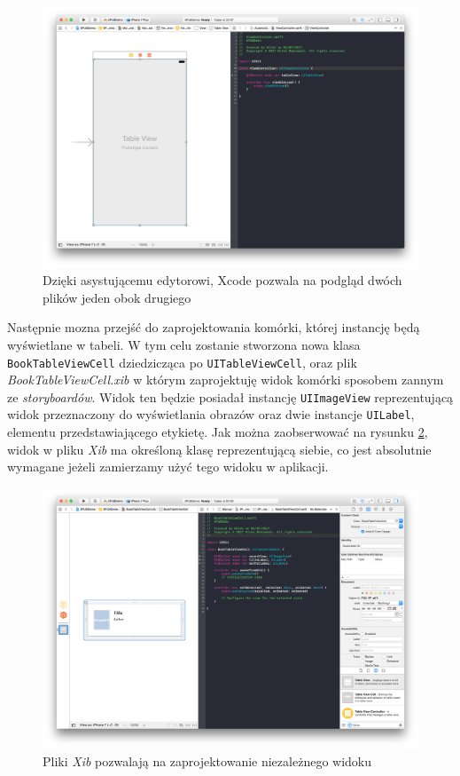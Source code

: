 \begin{figure}[ht!]
  \centering
  \includegraphics[width=120mm]{images/chapter-5-image-3-xcode-assistant.png}
  \caption{Dzięki asystującemu edytorowi, Xcode pozwala na podgląd dwóch plików jeden obok drugiego}
  \label{chapter-5-image-3-xcode-assistant}
\end{figure}

Następnie mozna przejść do zaprojektowania komórki, której instancję będą wyświetlane w tabeli. W tym celu zostanie stworzona nowa klasa \texttt{BookTableViewCell} dziedzicząca po \texttt{UITableViewCell}, oraz plik \textit{BookTableViewCell.xib} w którym zaprojektuję widok komórki sposobem zannym ze \textit{storyboardów}. Widok ten będzie posiadał instancję \texttt{UIImageView} reprezentującą widok przeznaczony do wyświetlania obrazów oraz dwie instancje \texttt{UILabel}, elementu przedstawiającego etykietę. Jak można zaobserwować na rysunku \ref{chapter-5-image-4-book-cell}, widok w pliku \textit{Xib} ma określoną klasę reprezentującą siebie, co jest absolutnie wymagane jeżeli zamierzamy użyć tego widoku w aplikacji.

\begin{figure}[ht!]
  \centering
  \includegraphics[width=120mm]{images/chapter-5-image-4-book-cell.png}
  \caption{Pliki \textit{Xib} pozwalają na zaprojektowanie niezależnego widoku}
  \label{chapter-5-image-4-book-cell}
\end{figure}

